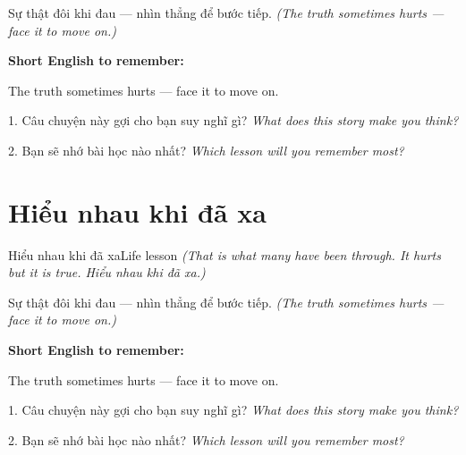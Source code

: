 \begin{baihoc}
Sự thật đôi khi đau — nhìn thẳng để bước tiếp.
\textit{(The truth sometimes hurts — face it to move on.)}
\end{baihoc}

\begin{ghinhoanh}
\textbf{Short English to remember:}

The truth sometimes hurts — face it to move on.

\end{ghinhoanh}

\begin{tuhocnhanh}
1. Câu chuyện này gợi cho bạn suy nghĩ gì? \textit{What does this story make you think?}

2. Bạn sẽ nhớ bài học nào nhất? \textit{Which lesson will you remember most?}
\end{tuhocnhanh}
\ngancach


\section{Hiểu nhau khi đã xa}
\begin{truyen}{Hiểu nhau khi đã xa}{Life lesson}
\textit{(That is what many have been through. It hurts but it is true. Hiểu nhau khi đã xa.)}
\end{truyen}

\begin{baihoc}
Sự thật đôi khi đau — nhìn thẳng để bước tiếp.
\textit{(The truth sometimes hurts — face it to move on.)}
\end{baihoc}

\begin{ghinhoanh}
\textbf{Short English to remember:}

The truth sometimes hurts — face it to move on.

\end{ghinhoanh}

\begin{tuhocnhanh}
1. Câu chuyện này gợi cho bạn suy nghĩ gì? \textit{What does this story make you think?}

2. Bạn sẽ nhớ bài học nào nhất? \textit{Which lesson will you remember most?}
\end{tuhocnhanh}
\ngancach
